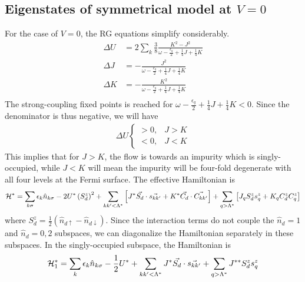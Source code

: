 \documentclass[12pt,twoside]{article}
\numberwithin{equation}{section}
\begin{document}
\subsection{Eigenstates of symmetrical model at \(V=0\)}
For the case of \(V=0\), the RG equations simplify considerably.
\begin{equation}\begin{aligned}
	\Delta U &= 2\sum_k \frac{3}{8}\frac{K^2 - J^2}{\omega - \frac{\epsilon_q}{2} + \frac{1}{4}J + \frac{1}{4}K} \\
	\Delta J &= - \frac{J^2}{\omega - \frac{\epsilon_q}{2} + \frac{1}{4}J + \frac{1}{4}K}\\
	\Delta K &= - \frac{K^2}{\omega - \frac{\epsilon_q}{2} + \frac{1}{4}J + \frac{1}{4}K}\\
\end{aligned}\end{equation}
The strong-coupling fixed points is reached for \(\omega - \frac{\epsilon_q}{2} + \frac{1}{4}J + \frac{1}{4}K < 0\). Since the denominator is thus negative, we will have
\begin{equation}\begin{aligned}
	\Delta U \begin{cases}
		> 0, & J> K \\
		< 0, & J< K
	\end{cases}
\end{aligned}\end{equation}
This implies that for \(J>K\), the flow is towards an impurity which is singly-occupied, while \(J < K\) will mean the impurity will be four-fold degenerate with all four levels at the Fermi surface. 
\pb The effective Hamiltonian is
\begin{equation}\begin{aligned}
	\mathcal{H}^* = \sum_{k\sigma} \epsilon_k \hat n_{k\sigma} - 2 U^* \left(S_d^z\right)^2 + \sum_{kk^\prime < \Lambda^*}\left[J^* \vec{S_d}\cdot\vec{s_{kk^\prime}} + K^* \vec{C_d}\cdot\vec{C_{kk^\prime}}\right] + \sum_{q > \Lambda^*}\left[J_q S_d^z s^z_{q} + K_q C_d^z C^z_{q}\right]
\end{aligned}\end{equation}
where \(S_d^z = \frac{1}{2}\left( \hat n_{d\uparrow} - \hat n_{d \downarrow} \right) \). Since the interaction terms do not couple the \(\hat n_{d}=1\) and \(\hat n_{d}=0,2\) subspaces, we can diagonalize the Hamiltonian separately in these subspaces. 
\pb In the singly-occupied subspace, the Hamiltonian is
\begin{equation}\begin{aligned}
	\mathcal{H}^*_{1} = \sum_k \epsilon_k \hat n_{k\sigma} - \frac{1}{2} U^* + \sum_{kk^\prime < \Lambda^*}J^* \vec{S_d}\cdot\vec{s_{kk^\prime}}+ \sum_{q > \Lambda^*}J^{**} S_d^z s^z_{q}
\end{aligned}\end{equation}
\end{document}
